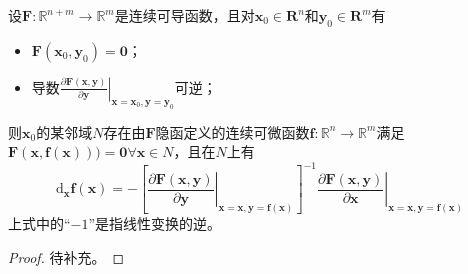 \documentclass[main.tex]{subfiles}
\begin{document}
\begin{theorem}[隐函数定理]\label{thm:II.4.13}
    设$\mathbf{F}:\mathbb{R}^{n+m}\rightarrow\mathbb{R}^m$是连续可导函数，且对$\mathbf{x}_0\in\mathbf{R}^n$和$\mathbf{y}_0\in\mathbf{R}^m$有
    \begin{itemize}
        \item $\mathbf{F}\left(\mathbf{x}_0,\mathbf{y}_0\right)=\mathbf{0}$；
        \item 导数$\left.\frac{\partial \mathbf{F}\left(\mathbf{x},\mathbf{y}\right)}{\partial \mathbf{y}}\right|_{\mathbf{x}=\mathbf{x}_0,\mathbf{y}=\mathbf{y}_0}$可逆；
    \end{itemize}
    则$\mathbf{x}_0$的某邻域$N$存在由$\mathbf{F}$隐函定义的连续可微函数$\mathbf{f}:\mathbb{R}^n\rightarrow\mathbb{R}^m$满足$\mathbf{F}\left(\mathbf{x},\mathbf{f}\left(\mathbf{x}\right)\right))=\mathbf{0}\forall\mathbf{x}\in N$，且在$N$上有
    \[\mathrm{d}_{\mathbf{x}}\mathbf{f}\left(\mathbf{x}\right)=-\left[\left.\frac{\partial\mathbf{F}\left(\mathbf{x},\mathbf{y}\right)}{\partial\mathbf{y}}\right|_{\mathbf{x}=\mathbf{x},\mathbf{y}=\mathbf{f}\left(\mathbf{x}\right)}\right]^{-1}\left.\frac{\partial\mathbf{F}\left(\mathbf{x},\mathbf{y}\right)}{\partial\mathbf{x}}\right|_{\mathbf{x}=\mathbf{x},\mathbf{y}=\mathbf{f}\left(\mathbf{x}\right)}\]
    上式中的“$-1$”是指线性变换的逆。
\end{theorem}
\begin{proof}
    待补充\cite[p.~593]{Williamson1972}。
\end{proof}
\end{document}
